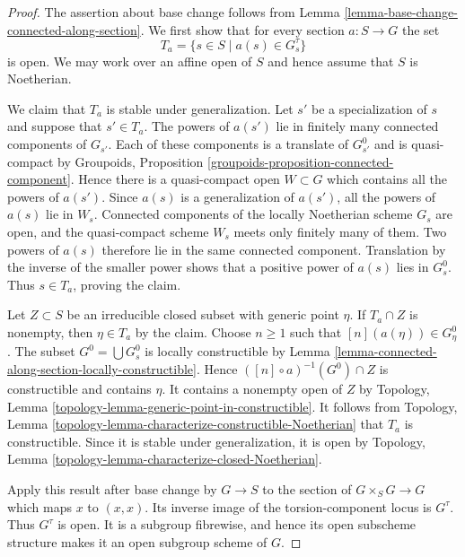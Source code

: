 \begin{proof}
The assertion about base change follows from
Lemma \ref{lemma-base-change-connected-along-section}. We first show that
for every section $a : S \to G$ the set
$$
T_a = \{s \in S \mid a(s) \in G_s^\tau\}
$$
is open. We may work over an affine open of $S$ and hence assume that $S$
is Noetherian.

\medskip\noindent
We claim that $T_a$ is stable under generalization. Let $s'$ be a
specialization of $s$ and suppose that $s' \in T_a$. The powers of $a(s')$
lie in finitely many connected components of $G_{s'}$. Each of these
components is a translate of $G_{s'}^0$ and is quasi-compact by Groupoids,
Proposition \ref{groupoids-proposition-connected-component}. Hence there is
a quasi-compact open $W \subset G$ which contains all the powers of $a(s')$.
Since $a(s)$ is a generalization of $a(s')$, all the powers of $a(s)$ lie
in $W_s$. Connected components of the locally Noetherian scheme $G_s$ are
open, and the quasi-compact scheme $W_s$ meets only finitely many of them.
Two powers of $a(s)$ therefore lie in the same connected component.
Translation by the inverse of the smaller power shows that a positive power
of $a(s)$ lies in $G_s^0$. Thus $s \in T_a$, proving the claim.

\medskip\noindent
Let $Z \subset S$ be an irreducible closed subset with generic point $\eta$.
If $T_a \cap Z$ is nonempty, then $\eta \in T_a$ by the claim. Choose
$n \geq 1$ such that $[n](a(\eta)) \in G_\eta^0$. The subset
$G^0 = \bigcup G_s^0$ is locally constructible by
Lemma \ref{lemma-connected-along-section-locally-constructible}. Hence
$([n] \circ a)^{-1}(G^0) \cap Z$ is constructible and contains $\eta$.
It contains a nonempty open of $Z$ by Topology, Lemma
\ref{topology-lemma-generic-point-in-constructible}. It follows from
Topology, Lemma
\ref{topology-lemma-characterize-constructible-Noetherian}
that $T_a$ is constructible. Since it is stable under generalization, it is
open by Topology, Lemma
\ref{topology-lemma-characterize-closed-Noetherian}.

Apply this result after base change by $G \to S$ to the section of
$G \times_S G \to G$ which maps $x$ to $(x, x)$. Its inverse image of the
torsion-component locus is $G^\tau$. Thus $G^\tau$ is open. It is a subgroup
fibrewise, and hence its open subscheme structure makes it an open subgroup
scheme of $G$.
\end{proof}

